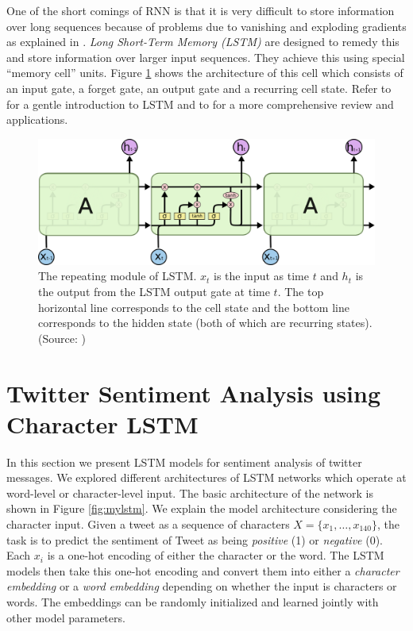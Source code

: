 \documentclass{article} %
\begin{document}
One of the short comings of RNN is that it is very difficult to store information over long sequences because of problems due to vanishing and exploding gradients as explained in \cite{hochreiter2001gradient}.
{\it Long Short-Term Memory (LSTM)} \cite{hochreiter1997long} are designed to remedy this and store information over larger input sequences.
They achieve this using special ``memory cell'' units. 
Figure \ref{fig:lstm} shows the architecture of this cell which consists of an input gate, a forget gate, an output gate and a recurring cell state. 
Refer to \cite{colah} for a gentle introduction to LSTM and to \cite{graves2012supervised} for a more comprehensive review and applications.

\begin{figure}
	\centering
	\includegraphics[width=\textwidth]{figs/LSTM.png}
	\caption{The repeating module of LSTM. $x_t$ is the input as time $t$ and $h_t$ is the output from the LSTM output gate at time $t$. The top horizontal line corresponds to the cell state and the bottom line corresponds to the hidden state (both of which are recurring states).
	(Source: \cite{colah})}
	\label{fig:lstm}
\end{figure}


\section{Twitter Sentiment Analysis using Character LSTM}
In this section we present LSTM models for sentiment analysis of twitter messages. We explored different architectures of LSTM networks which operate at word-level or character-level input. The basic architecture of the network is shown in Figure \ref{fig:mylstm}.
We explain the model architecture considering the character input.
Given a tweet as a sequence of characters $X=\{x_1, \ldots, x_{140}\}$, the task is to predict the sentiment of Tweet as being {\it positive} (1) or {\it negative} (0). Each $x_i$ is a one-hot encoding of either the character or the word. The LSTM models then take this one-hot encoding and convert them into either a {\it character embedding} or a {\it word embedding} depending on whether the input is characters or words. The embeddings can be randomly initialized and learned jointly with other model parameters.
\end{document}
